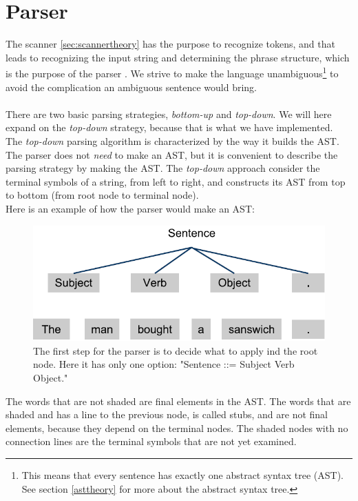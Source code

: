\section{Parser}
\label{sec:parser}
The scanner \ref{sec:scannertheory} has the purpose to recognize tokens, and that leads to recognizing the input string and determining the phrase structure, which is the purpose of the parser \cite{misc:spo}. We strive to make the language unambiguous\footnote{This means that every sentence has exactly one abstract syntax tree (AST). See section \ref{asttheory} for more about the abstract syntax tree.} to avoid the complication an ambiguous sentence would bring.\\
\\
There are two basic parsing strategies, \textit{bottom-up} and \textit{top-down}. We will here expand on the \textit{top-down} strategy, because that is what we have implemented.\\ \indent
The \textit{top-down} parsing algorithm is characterized by the way it builds the AST. The parser does not \textit{need} to make an AST, but it is convenient to describe the parsing strategy by making the AST. The \textit{top-down} approach consider the terminal symbols of a string, from left to right, and constructs its AST from top to bottom (from root node to terminal node).\\ \indent
Here is an example of how the parser would make an AST:

\begin{figure}[H]
\begin{center}
\includegraphics[scale=0.5]{Images/parsingexample/AST1.png}
\end{center}
\caption{The first step for the parser is to decide what to apply ind the root node. Here it has only one option: "Sentence ::= Subject Verb Object."}
\end{figure}

The words that are not shaded are final elements in the AST. The words that are shaded and has a line to the previous node, is called stubs, and are not final elements, because they depend on the terminal nodes. The shaded nodes with no connection lines are the terminal symbols that are not yet examined.


